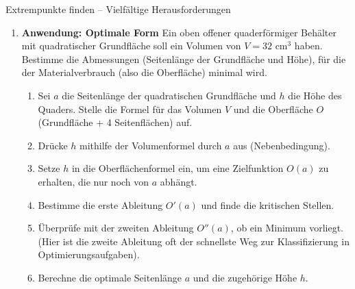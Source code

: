 \begin{aufgabenumgebung}{Extrempunkte finden – Vielfältige Herausforderungen}
\begin{enumerate}
    \item \textbf{Anwendung: Optimale Form}
        Ein oben offener quaderförmiger Behälter mit quadratischer Grundfläche soll ein Volumen von $V=32 \text{ cm}^3$ haben. Bestimme die Abmessungen (Seitenlänge der Grundfläche und Höhe), für die der Materialverbrauch (also die Oberfläche) minimal wird.
        \begin{enumerate}[label=(\alph*)]
            \item Sei $a$ die Seitenlänge der quadratischen Grundfläche und $h$ die Höhe des Quaders. Stelle die Formel für das Volumen $V$ und die Oberfläche $O$ (Grundfläche + 4 Seitenflächen) auf.
            \item Drücke $h$ mithilfe der Volumenformel durch $a$ aus (Nebenbedingung).
            \item Setze $h$ in die Oberflächenformel ein, um eine Zielfunktion $O(a)$ zu erhalten, die nur noch von $a$ abhängt.
            \item Bestimme die erste Ableitung $O'(a)$ und finde die kritischen Stellen.
            \item Überprüfe mit der zweiten Ableitung $O''(a)$, ob ein Minimum vorliegt. (Hier ist die zweite Ableitung oft der schnellste Weg zur Klassifizierung in Optimierungsaufgaben).
            \item Berechne die optimale Seitenlänge $a$ und die zugehörige Höhe $h$.
        \end{enumerate}
\end{enumerate}
\end{aufgabenumgebung}


